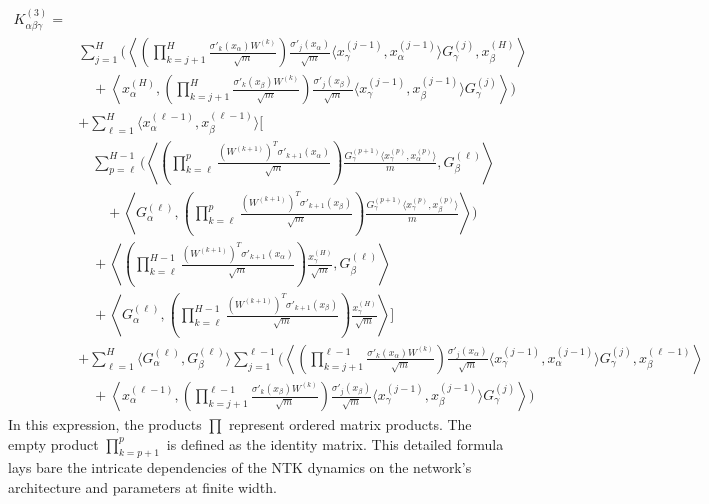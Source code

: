 \documentclass[11pt,a4paper]{article}
\theoremstyle{definition}
\begin{document}
\begin{align}
K^{(3)}_{\alpha\beta\gamma} = & \nonumber \\
& \sum_{j=1}^{H} \Biggl( \left\langle \left( \prod_{k=j+1}^{H} \frac{\sigma'_{k}(x_\alpha) W^{(k)}}{\sqrt{m}} \right) \frac{\sigma'_{j}(x_\alpha)}{\sqrt{m}} \langle x^{(j-1)}_\gamma, x^{(j-1)}_\alpha \rangle G^{(j)}_\gamma, x^{(H)}_\beta \right\rangle \nonumber \\
& \quad + \left\langle x^{(H)}_\alpha, \left( \prod_{k=j+1}^{H} \frac{\sigma'_{k}(x_\beta) W^{(k)}}{\sqrt{m}} \right) \frac{\sigma'_{j}(x_\beta)}{\sqrt{m}} \langle x^{(j-1)}_\gamma, x^{(j-1)}_\beta \rangle G^{(j)}_\gamma \right\rangle \Biggr) \nonumber \\
& + \sum_{\ell=1}^{H} \langle x^{(\ell-1)}_\alpha, x^{(\ell-1)}_\beta \rangle \Biggl[ \nonumber \\
& \quad \sum_{p=\ell}^{H-1} \Biggl( \left\langle \left( \prod_{k=\ell}^{p} \frac{(W^{(k+1)})^T \sigma'_{k+1}(x_\alpha)}{\sqrt{m}} \right) \frac{G^{(p+1)}_\gamma \langle x^{(p)}_\gamma, x^{(p)}_\alpha \rangle}{m}, G^{(\ell)}_\beta \right\rangle \nonumber \\
& \qquad + \left\langle G^{(\ell)}_\alpha, \left( \prod_{k=\ell}^{p} \frac{(W^{(k+1)})^T \sigma'_{k+1}(x_\beta)}{\sqrt{m}} \right) \frac{G^{(p+1)}_\gamma \langle x^{(p)}_\gamma, x^{(p)}_\beta \rangle}{m} \right\rangle \Biggr) \nonumber \\
& \quad + \left\langle \left( \prod_{k=\ell}^{H-1} \frac{(W^{(k+1)})^T \sigma'_{k+1}(x_\alpha)}{\sqrt{m}} \right) \frac{x^{(H)}_\gamma}{\sqrt{m}}, G^{(\ell)}_\beta \right\rangle \nonumber \\
& \quad + \left\langle G^{(\ell)}_\alpha, \left( \prod_{k=\ell}^{H-1} \frac{(W^{(k+1)})^T \sigma'_{k+1}(x_\beta)}{\sqrt{m}} \right) \frac{x^{(H)}_\gamma}{\sqrt{m}} \right\rangle \Biggr] \nonumber \\
& + \sum_{\ell=1}^{H} \langle G^{(\ell)}_\alpha, G^{(\ell)}_\beta \rangle \sum_{j=1}^{\ell-1} \Biggl( \left\langle \left( \prod_{k=j+1}^{\ell-1} \frac{\sigma'_{k}(x_\alpha) W^{(k)}}{\sqrt{m}} \right) \frac{\sigma'_{j}(x_\alpha)}{\sqrt{m}} \langle x^{(j-1)}_\gamma, x^{(j-1)}_\alpha \rangle G^{(j)}_\gamma, x^{(\ell-1)}_\beta \right\rangle \nonumber \\
& \quad + \left\langle x^{(\ell-1)}_\alpha, \left( \prod_{k=j+1}^{\ell-1} \frac{\sigma'_{k}(x_\beta) W^{(k)}}{\sqrt{m}} \right) \frac{\sigma'_{j}(x_\beta)}{\sqrt{m}} \langle x^{(j-1)}_\gamma, x^{(j-1)}_\beta \rangle G^{(j)}_\gamma \right\rangle \Biggr)
\end{align}
In this expression, the products $\prod$ represent ordered matrix products. The empty product $\prod_{k=p+1}^p$ is defined as the identity matrix. This detailed formula lays bare the intricate dependencies of the NTK dynamics on the network's architecture and parameters at finite width.
\end{document}
